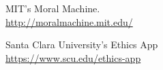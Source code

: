 \documentclass[12pt,journal,compsoc]{IEEEtran}
\begin{document}
\ifCLASSOPTIONcaptionsoff
  \newpage
\fi


\begin{thebibliography}{1}

MIT's Moral Machine. \\
\url{http://moralmachine.mit.edu/}

Santa Clara University's Ethics App\\
\url{https://www.scu.edu/ethics-app}

\end{thebibliography}
\end{document}
